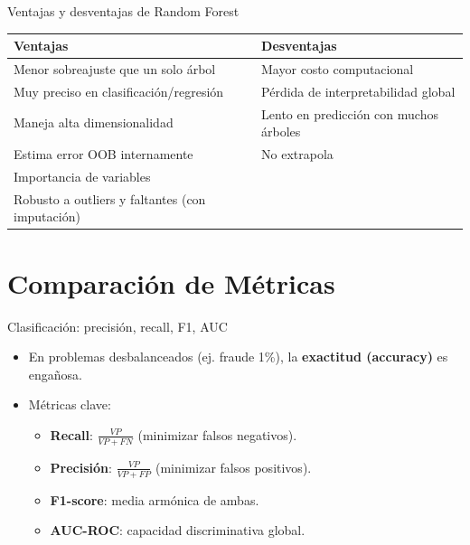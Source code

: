 \documentclass[aspectratio=169, 10pt, xcolor=table]{beamer}
\begin{document}
\begin{frame}{Ventajas y desventajas de Random Forest}
    \begin{table}
        \centering
        \begin{tabular}{p{4.5cm}|p{4.5cm}}
            \toprule
            \textbf{Ventajas} & \textbf{Desventajas} \\
            \midrule
            Menor sobreajuste que un solo árbol & Mayor costo computacional \\
            Muy preciso en clasificación/regresión & Pérdida de interpretabilidad global \\
            Maneja alta dimensionalidad & Lento en predicción con muchos árboles \\
            Estima error OOB internamente & No extrapola \\
            Importancia de variables & \\
            Robusto a outliers y faltantes (con imputación) & \\
            \bottomrule
        \end{tabular}
    \end{table}
\end{frame}

\section{Comparación de Métricas}

\begin{frame}{Clasificación: precisión, recall, F1, AUC}
    \begin{itemize}
        \item En problemas desbalanceados (ej. fraude 1\%), la \textbf{exactitud (accuracy)} es engañosa.
        \item Métricas clave:
        \begin{itemize}
            \item \textbf{Recall}: $\frac{VP}{VP+FN}$ (minimizar falsos negativos).
            \item \textbf{Precisión}: $\frac{VP}{VP+FP}$ (minimizar falsos positivos).
            \item \textbf{F1-score}: media armónica de ambas.
            \item \textbf{AUC-ROC}: capacidad discriminativa global.
        \end{itemize}
    \end{itemize}
\end{frame}
\end{document}
